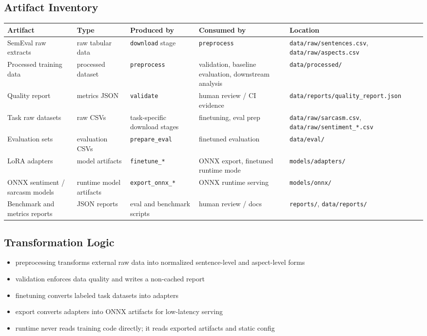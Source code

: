 \subsection{Artifact Inventory}
\begin{longtable}{@{}p{}p{}p{}p{}p{}@{}}
\toprule
\textbf{Artifact} & \textbf{Type} & \textbf{Produced by} & \textbf{Consumed by} & \textbf{Location} \\
\midrule
\endhead
SemEval raw extracts & raw tabular data & \texttt{download} stage & \texttt{preprocess} & \texttt{data/raw/sentences.csv}, \texttt{data/raw/aspects.csv} \\
Processed training data & processed dataset & \texttt{preprocess} & validation, baseline evaluation, downstream analysis & \texttt{data/processed/} \\
Quality report & metrics JSON & \texttt{validate} & human review / CI evidence & \texttt{data/reports/quality\_report.json} \\
Task raw datasets & raw CSVs & task-specific download stages & finetuning, eval prep & \texttt{data/raw/sarcasm.csv}, \texttt{data/raw/sentiment\_*.csv} \\
Evaluation sets & evaluation CSVs & \texttt{prepare\_eval} & finetuned evaluation & \texttt{data/eval/} \\
LoRA adapters & model artifacts & \texttt{finetune\_*} & ONNX export, finetuned runtime mode & \texttt{models/adapters/} \\
ONNX sentiment / sarcasm models & runtime model artifacts & \texttt{export\_onnx\_*} & ONNX runtime serving & \texttt{models/onnx/} \\
Benchmark and metrics reports & JSON reports & eval and benchmark scripts & human review / docs & \texttt{reports/}, \texttt{data/reports/} \\
\bottomrule
\end{longtable}

\subsection{Transformation Logic}
\begin{itemize}[leftmargin=1.2em]
  \item preprocessing transforms external raw data into normalized sentence-level and aspect-level forms
  \item validation enforces data quality and writes a non-cached report
  \item finetuning converts labeled task datasets into adapters
  \item export converts adapters into ONNX artifacts for low-latency serving
  \item runtime never reads training code directly; it reads exported artifacts and static config
\end{itemize}

